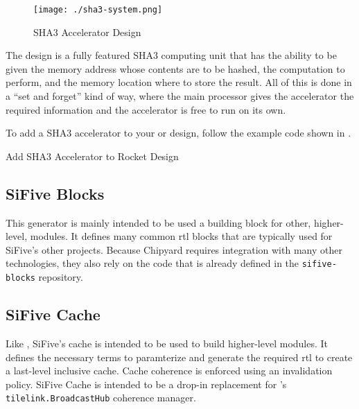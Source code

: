 \begin{figure}[h!tbp]
  \centering
  \texttt{[image: ./sha3-system.png]}
  \caption{SHA3 Accelerator Design~\cite[p.~3]{sha3Paper}}
  \label{fig:SHA3_Accelerator_Design}
\end{figure}

The design is a fully featured SHA3 computing unit that has the ability to be given the memory address whose contents are to be hashed, the computation to perform, and the memory location where to store the result.
All of this is done in a ``set and forget'' kind of way, where the main processor gives the accelerator the required information and the accelerator is free to run on its own.

To add a SHA3 accelerator to your  or  design, follow the example code shown in .

\begin{listing}[h!tbp]
\caption{Add SHA3 Accelerator to Rocket Design}
\label{lst:SHA3_Accelerator_Addition}
\end{listing}

\subsection{SiFive Blocks}\label{sec:SiFive_Blocks}
\nocite{siFiveBlocksGithub}
This generator is mainly intended to be used a building block for other, higher-level, modules.
It defines many common \gls{rtl} blocks that are typically used for SiFive's other projects.
Because Chipyard requires integration with many other technologies, they also rely on the code that is already defined in the \texttt{sifive-blocks} repository.

\subsection{SiFive Cache}\label{sec:SiFive_Cache}
\nocite{siFiveCacheGithub}
Like , SiFive's cache is intended to be used to build higher-level modules.
It defines the necessary terms to paramterize and generate the required \gls{rtl} to create a last-level inclusive cache.
Cache coherence is enforced using an invalidation policy.
SiFive Cache is intended to be a drop-in replacement for 's \texttt{tilelink.BroadcastHub} coherence manager.

